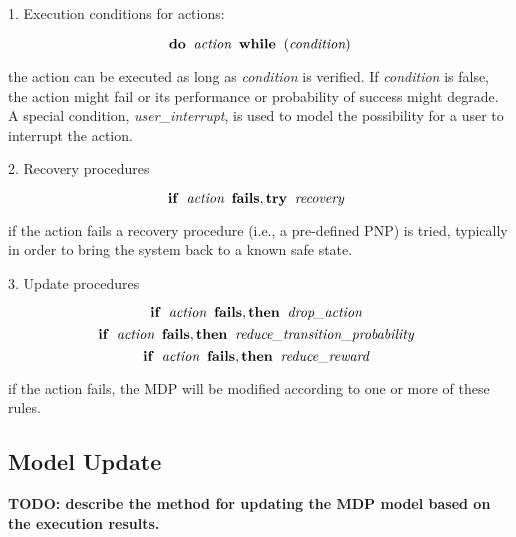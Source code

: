 \vspace{0.5cm}

1. Execution conditions for actions:

\[ \mathbf{do} \;\; \emph{action} \;\; \mathbf{while} \;\; ( \emph{condition} ) \]

\noindent
the action can be executed as long as \emph{condition} is verified.
If \emph{condition} is false, the action might fail or its performance or probability of success might degrade.
A special condition, \emph{user\_interrupt}, is used to model the possibility for a user to interrupt the action.

\vspace{0.5cm}

2. Recovery procedures

\[ \mathbf{if} \;\; \emph{action} \;\; \mathbf{fails, try} \;\; \emph{recovery} \;\; \]

\noindent
if the action fails a recovery procedure (i.e., a pre-defined PNP) is tried, typically in order to bring the system back to a known safe state.


\vspace{0.5cm}

3. Update procedures

\[ \mathbf{if} \;\; \emph{action} \;\; \mathbf{fails, then} \;\; \emph{drop\_action} \;\; \]
\[ \mathbf{if} \;\; \emph{action} \;\; \mathbf{fails, then} \;\; \emph{reduce\_transition\_probability} \;\; \]
\[ \mathbf{if} \;\; \emph{action} \;\; \mathbf{fails, then} \;\; \emph{reduce\_reward} \;\; \]



\noindent
if the action fails, the MDP will be modified according to one or more of these rules.






\subsection{Model Update}


\vspace{0.5cm}
{\bf TODO: describe the method for updating the MDP model based on the execution results.}
\vspace{0.5cm}




